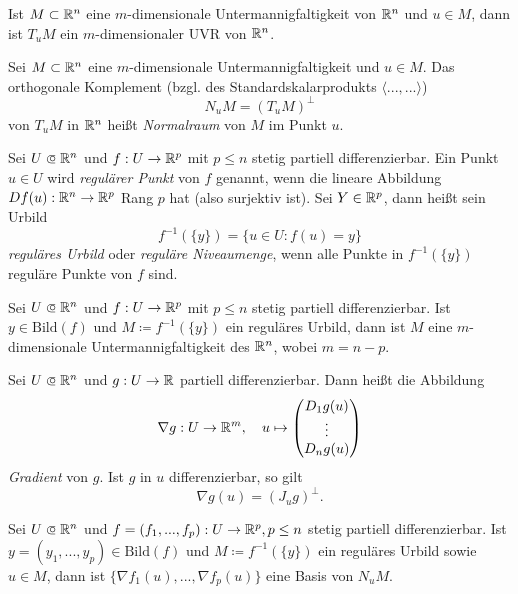 \documentclass{cheat-sheet}
\newcommand\opn{\mathrel{\ooalign{$\subset$\cr
  \hidewidth\raise.1ex\hbox{$\circ\mkern.5mu$}\cr}}}
\begin{document}
\begin{satz}
Ist $M \subset \mathbb{R}^n$ eine $m$-dimensionale Untermannigfaltigkeit von $\mathbb{R}^n$ und $u \in M$, dann ist $T_u M$ ein $m$-dimensionaler UVR von $\mathbb{R}^n$.
\end{satz}

\begin{defn}
Sei $M \subset \mathbb{R}^n$ eine $m$-dimensionale Untermannigfaltigkeit und $u \in M$. Das orthogonale Komplement (bzgl. des Standardskalarprodukts $\langle ..., ... \rangle$)
\[ N_u M = (T_u M)^\perp \]
von $T_u M$ in $\mathbb{R}^n$ heißt \emph{Normalraum} von $M$ im Punkt $u$.
\end{defn}

\begin{defn}
Sei $U \opn \R^n$ und $f : U \to \mathbb{R}^p$ mit $p \le n$ stetig partiell differenzierbar. Ein Punkt $u \in U$ wird \emph{regulärer Punkt} von $f$ genannt, wenn die lineare Abbildung $D f(u) : \mathbb{R}^n \to \mathbb{R}^p$ Rang $p$ hat (also surjektiv ist). Sei $Y \in \mathbb{R}^p$, dann heißt sein Urbild
\[ f^{-1}(\{y\}) = \{ u \in U : f(u) = y \} \]
\emph{reguläres Urbild} oder \emph{reguläre Niveaumenge}, wenn alle Punkte in $f^{-1}(\{ y \})$ reguläre Punkte von $f$ sind.
\end{defn}

\begin{defn}
Sei $U \opn \R^n$ und $f : U \to \mathbb{R}^p$ mit $p \le n$ stetig partiell differenzierbar. Ist $y \in \mathrm{Bild}(f)$ und $M \coloneqq f^{-1}(\{ y \})$ ein reguläres Urbild, dann ist $M$ eine $m$-dimensionale Untermannigfaltigkeit des $\mathbb{R}^n$, wobei $m = n - p$.
\end{defn}

\begin{defn}
Sei $U \opn \R^n$ und $g : U \to \mathbb{R}$ partiell differenzierbar. Dann heißt die Abbildung
\[ \nabla g : U \to \mathbb{R}^m,\quad u \mapsto \begin{pmatrix} D_1 g(u) \\ \vdots \\ D_n g(u) \end{pmatrix} \]
\emph{Gradient} von $g$. Ist $g$ in $u$ differenzierbar, so gilt
\[ \nabla g(u) = (J_u g)^\perp. \]
\end{defn}

\begin{satz}
Sei $U \opn \R^n$ und $f = (f_1, ..., f_p) : U \to \mathbb{R}^p, p \le n$ stetig partiell differenzierbar. Ist $y = (y_1, ..., y_p) \in \mathrm{Bild}(f)$ und $M \coloneqq f^{-1}(\{ y \})$ ein reguläres Urbild sowie $u \in M$, dann ist $\{ \nabla f_1(u), ..., \nabla f_p(u) \}$ eine Basis von $N_u M$.
\end{satz}
\end{document}
